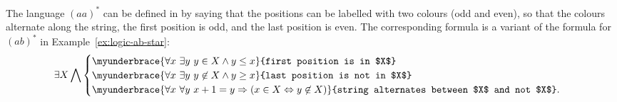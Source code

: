 \begin{myexample}\label{ex:logic-parity}
    The language $(aa)^*$ can be defined in \mso by saying that the positions can be labelled with two colours (odd and even), so that the colours alternate along the string, the first position is odd, and the last position is even. The corresponding formula  is a variant of the formula for $(ab)^*$ in Example~\ref{ex:logic-ab-star}:
\begin{align*}
    \exists X 
\bigwedge
\begin{cases}
    \myunderbrace{\forall x \ \exists y \ y \in X \land y \leq x}{first position is in $X$} \\ 
    \myunderbrace{\forall x \ \exists y \ y \not \in X \land y \geq x}{last position is not in $X$} \\
    \myunderbrace{\forall x \ \forall y \ x + 1 = y \Rightarrow (x \in X \Leftrightarrow y \not \in X)}{string alternates between $X$ and not $X$}.
\end{cases}
\end{align*}
\end{myexample}

